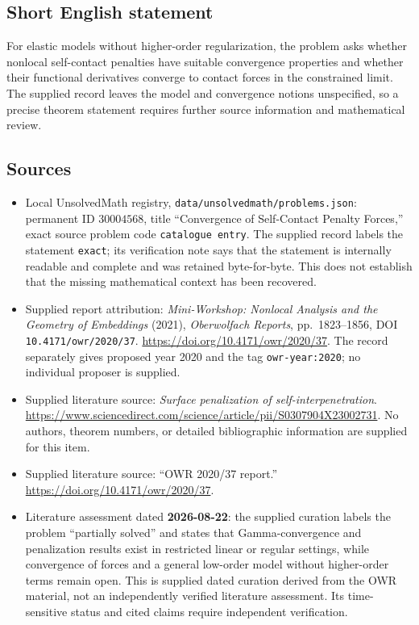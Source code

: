 \documentclass[11pt]{article}
\begin{document}
\subsection{Short English statement}
For elastic models without higher-order regularization, the problem asks whether nonlocal self-contact penalties have suitable convergence properties and whether their functional derivatives converge to contact forces in the constrained limit. The supplied record leaves the model and convergence notions unspecified, so a precise theorem statement requires further source information and mathematical review.
\subsection{Sources}
\begin{itemize}
\item Local UnsolvedMath registry, \texttt{data/unsolvedmath/problems.json}: permanent ID \(30004568\), title ``Convergence of Self-Contact Penalty Forces,'' exact source problem code \texttt{catalogue entry}. The supplied record labels the statement \texttt{exact}; its verification note says that the statement is internally readable and complete and was retained byte-for-byte. This does not establish that the missing mathematical context has been recovered.
\item Supplied report attribution: \emph{Mini-Workshop: Nonlocal Analysis and the Geometry of Embeddings} (2021), \emph{Oberwolfach Reports}, pp.\ 1823--1856, DOI \texttt{10.4171/owr/2020/37}. \url{https://doi.org/10.4171/owr/2020/37}. The record separately gives proposed year 2020 and the tag \texttt{owr-year:2020}; no individual proposer is supplied.
\item Supplied literature source: \emph{Surface penalization of self-interpenetration}. \url{https://www.sciencedirect.com/science/article/pii/S0307904X23002731}. No authors, theorem numbers, or detailed bibliographic information are supplied for this item.
\item Supplied literature source: ``OWR 2020/37 report.'' \url{https://doi.org/10.4171/owr/2020/37}.
\item Literature assessment dated \textbf{2026-08-22}: the supplied curation labels the problem ``partially solved'' and states that Gamma-convergence and penalization results exist in restricted linear or regular settings, while convergence of forces and a general low-order model without higher-order terms remain open. This is supplied dated curation derived from the OWR material, not an independently verified literature assessment. Its time-sensitive status and cited claims require independent verification.
\end{itemize}
\end{document}
